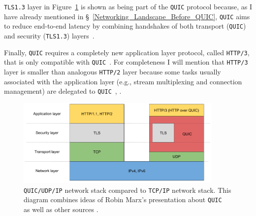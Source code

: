 \documentclass[12pt,a4paper,twoside,openright]{report}
\begin{document}
\texttt{TLS1.3} layer in Figure~\ref{fig:QUIC_network_stack} is shown as being part of the \texttt{QUIC} protocol because, as I have already mentioned in \S~\ref{Networking_Landscape_Before_QUIC},  \texttt{QUIC} aims to reduce end-to-end latency by combining handshakes of both transport (\texttt{QUIC}) and security (\texttt{TLS1.3}) layers~\cite{Google_QUIC_protocol_moving_the_web_from_TCP_to_UDP, HTTP_3_the_past_the_present_and_the_future}.

Finally, \texttt{QUIC} requires a completely new application layer protocol, called \texttt{HTTP/3}, that is only compatible with \texttt{QUIC}~\cite{head-of-line-blocking-in-quic-and-http-3-the-details}.
For completeness I will mention that \texttt{HTTP/3} layer is smaller than analogous \texttt{HTTP/2} layer because some tasks usually associated with the application layer (e.g., stream multiplexing and connection management) are delegated to \texttt{QUIC}~\cite{bib_grigorik2013}, \cite[Chapter 12]{Google_QUIC_protocol_moving_the_web_from_TCP_to_UDP}.



    \begin{figure}[ht]
    \centering
    \includegraphics[width=0.9\textwidth]{figs/Layers_in_the_protocol_stack.png}
    \caption[\texttt{QUIC/UDP/IP} network stack compared to \texttt{TCP/IP} network stack]{\texttt{QUIC/UDP/IP} network stack compared to \texttt{TCP/IP} network stack. This diagram combines ideas of Robin Marx's presentation about \texttt{QUIC}~\cite{head-of-line-blocking-in-quic-and-http-3-the-details} as well as other sources \cite{overview_of_the_QUIC_protocol, IETF_presentation_about_QUIC, HTTP_3_the_past_the_present_and_the_future}.
    }
    \label{fig:QUIC_network_stack}
    \end{figure}
\end{document}
